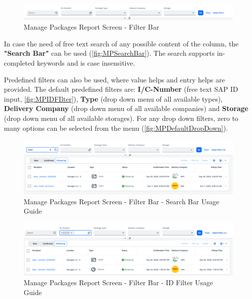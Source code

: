\begin{figure}[H]
	\centering
	\includegraphics[width=1\linewidth]{images/user_doc/managePack/ReportScreen/browse/FilterBar.png}
	\caption{Manage Packages Report Screen - Filter Bar}
	\label{fig:MPFIlterBar}
\end{figure}

In case the need of free text search of any possible content of the column, the \textbf{"Search Bar"} can be used (\autoref{fig:MPSearchBar}). The search supports in-completed keywords and is case insensitive. 

Predefined filters can also be used, where value helps and entry helps are provided.
The default predefined filters are: \textbf{I/C-Number} (free text SAP ID input, \autoref{fig:MPIDFIlter}), \textbf{Type} (drop down menu of all available types), \textbf{Delivery Company} (drop down menu of all available companies) and \textbf{Storage} (drop down menu of all available storages). 
For any drop down filters, zero to many options can be selected from the menu (\autoref{fig:MPDefaultDropDown}). 

\bigskip

\begin{figure}[htb]
	\centering
	\includegraphics[width=1\linewidth]{images/user_doc/managePack/ReportScreen/browse/defaultSearchBarUsage.png}
	\caption{Manage Packages Report Screen - Filter Bar - Search Bar Usage Guide}
	\label{fig:MPSearchBar}
\end{figure}

\begin{figure}[htb]
	\centering
	\includegraphics[width=1\linewidth]{images/user_doc/managePack/ReportScreen/browse/defaultFreeTextIdUsage.png}
	\caption{Manage Packages Report Screen - Filter Bar - ID Filter Usage Guide}
	\label{fig:MPIDFIlter}
\end{figure}


